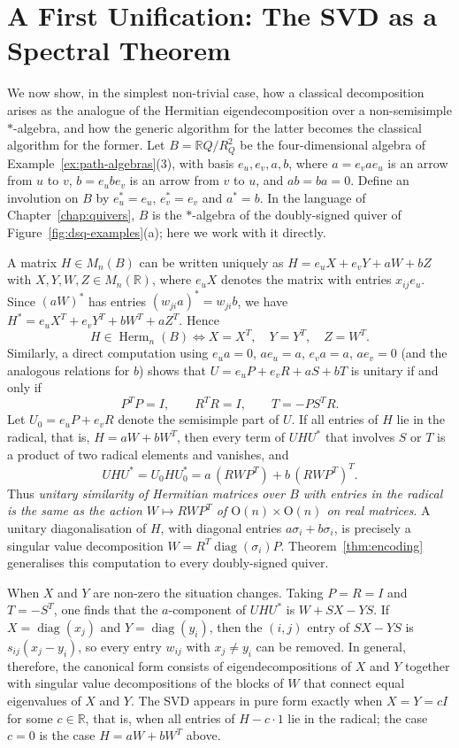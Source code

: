 \documentclass[12pt, a4paper]{report}
\theoremstyle{plain}
\theoremstyle{definition}
\theoremstyle{remark}
\theoremstyle{plain}
\newcommand{\RR}{\mathbb{R}}
\newcommand{\Or}{\mathrm{O}}
\newcommand{\Herm}{\operatorname{Herm}}
\DeclareMathOperator{\diag}{diag}
\begin{document}
\section{A First Unification: The SVD as a Spectral Theorem}
\label{sec:unification-example}
We now show, in the simplest non-trivial case, how a classical decomposition arises as the analogue of the Hermitian eigendecomposition over a non-semisimple $*$-algebra, and how the generic algorithm for the latter becomes the classical algorithm for the former. Let $B=\RR Q/R_Q^2$ be the four-dimensional algebra of Example~\ref{ex:path-algebras}(3), with basis $e_u,e_v,a,b$, where $a=e_vae_u$ is an arrow from $u$ to $v$, $b=e_ube_v$ is an arrow from $v$ to $u$, and $ab=ba=0$. Define an involution on $B$ by $e_u^*=e_u$, $e_v^*=e_v$ and $a^*=b$. In the language of Chapter~\ref{chap:quivers}, $B$ is the $*$-algebra of the doubly-signed quiver of Figure~\ref{fig:dsq-examples}(a); here we work with it directly.

A matrix $H\in M_n(B)$ can be written uniquely as $H=e_uX+e_vY+aW+bZ$ with $X,Y,W,Z\in M_n(\RR)$, where $e_uX$ denotes the matrix with entries $x_{ij}e_u$. Since $(aW)^*$ has entries $(w_{ji}a)^*=w_{ji}b$, we have $H^*=e_uX^T+e_vY^T+bW^T+aZ^T$. Hence
\[
  H\in\Herm_n(B)\iff X=X^T,\quad Y=Y^T,\quad Z=W^T .
\]
Similarly, a direct computation using $e_ua=0$, $ae_u=a$, $e_va=a$, $ae_v=0$ (and the analogous relations for $b$) shows that $U=e_uP+e_vR+aS+bT$ is unitary if and only if
\[
  P^TP=I,\qquad R^TR=I,\qquad T=-PS^TR .
\]
Let $U_0=e_uP+e_vR$ denote the semisimple part of $U$. If all entries of $H$ lie in the radical, that is, $H=aW+bW^T$, then every term of $UHU^*$ that involves $S$ or $T$ is a product of two radical elements and vanishes, and
\begin{equation}\label{eq:svd-action}
  UHU^*=U_0HU_0^*=a\,(RWP^T)+b\,(RWP^T)^T .
\end{equation}
Thus \emph{unitary similarity of Hermitian matrices over $B$ with entries in the radical is the same as the action $W\mapsto RWP^T$ of $\Or(n)\times\Or(n)$ on real matrices}. A unitary diagonalisation of $H$, with diagonal entries $a\sigma_i+b\sigma_i$, is precisely a singular value decomposition $W=R^T\diag(\sigma_i)P$. Theorem~\ref{thm:encoding} generalises this computation to every doubly-signed quiver.

When $X$ and $Y$ are non-zero the situation changes. Taking $P=R=I$ and $T=-S^T$, one finds that the $a$-component of $UHU^*$ is $W+SX-YS$. If $X=\diag(x_j)$ and $Y=\diag(y_i)$, then the $(i,j)$ entry of $SX-YS$ is $s_{ij}(x_j-y_i)$, so every entry $w_{ij}$ with $x_j\neq y_i$ can be removed. In general, therefore, the canonical form consists of eigendecompositions of $X$ and $Y$ together with singular value decompositions of the blocks of $W$ that connect equal eigenvalues of $X$ and $Y$. The SVD appears in pure form exactly when $X=Y=cI$ for some $c\in\RR$, that is, when all entries of $H-c\cdot1$ lie in the radical; the case $c=0$ is the case $H=aW+bW^T$ above.
\end{document}
